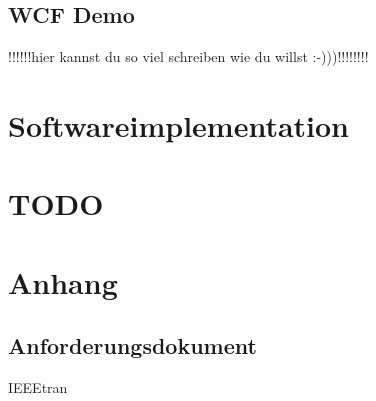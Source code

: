 \documentclass[12pt,a4paper,bibliography=totocnumbered,listof=totocnumbered]{scrartcl}
\begin{document}
\subsection{WCF Demo}
!!!!!!hier kannst du so viel schreiben wie du willst :-)))!!!!!!!!

\newpage
\section{Softwareimplementation}
\sloppy

\newpage
\section{TODO}

\section{Anhang}
\subsection{Anforderungsdokument}  \label{Anforderungsdokument}

\sloppy

\newpage



\pagebreak



\renewcommand{\centermark}{}
\renewcommand\refname{Quellenverzeichnis}
 {IEEEtran}


\pagebreak
\end{document}
